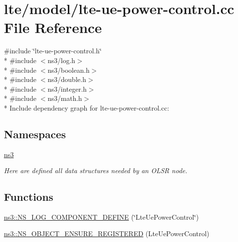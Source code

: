 \hypertarget{lte-ue-power-control_8cc}{}\section{lte/model/lte-\/ue-\/power-\/control.cc File Reference}
\label{lte-ue-power-control_8cc}
{\ttfamily \#include \char`\"{}lte-\/ue-\/power-\/control.\+h\char`\"{}}\\*
{\ttfamily \#include $<$ns3/log.\+h$>$}\\*
{\ttfamily \#include $<$ns3/boolean.\+h$>$}\\*
{\ttfamily \#include $<$ns3/double.\+h$>$}\\*
{\ttfamily \#include $<$ns3/integer.\+h$>$}\\*
{\ttfamily \#include $<$ns3/math.\+h$>$}\\*
Include dependency graph for lte-\/ue-\/power-\/control.cc\+:
\subsection*{Namespaces}
\begin{DoxyCompactItemize}
\item 
 \hyperlink{namespacens3}{ns3}
\begin{DoxyCompactList}\small\item\em Here are defined all data structures needed by an O\+L\+SR node. \end{DoxyCompactList}\end{DoxyCompactItemize}
\subsection*{Functions}
\begin{DoxyCompactItemize}
\item 
\hyperlink{namespacens3_a0921402e64a84611775872d9aae17a74}{ns3\+::\+N\+S\+\_\+\+L\+O\+G\+\_\+\+C\+O\+M\+P\+O\+N\+E\+N\+T\+\_\+\+D\+E\+F\+I\+NE} (\char`\"{}Lte\+Ue\+Power\+Control\char`\"{})
\item 
\hyperlink{namespacens3_a4e09494df30c125d20e5685e087eaaa2}{ns3\+::\+N\+S\+\_\+\+O\+B\+J\+E\+C\+T\+\_\+\+E\+N\+S\+U\+R\+E\+\_\+\+R\+E\+G\+I\+S\+T\+E\+R\+ED} (Lte\+Ue\+Power\+Control)
\end{DoxyCompactItemize}
